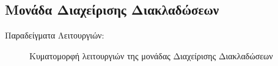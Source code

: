 \documentclass[11pt]{extarticle}
\begin{document}
\subsection{Μονάδα Διαχείρισης Διακλαδώσεων}
Παραδείγματα Λειτουργιών:
\begin{figure}[H]
\centering
\renewcommand{\figurename}{Κυματομορφή} 
\caption[Κυματομορφή - Μονάδα Διαχείρισης Διακλαδώσεων]{Κυματομορφή λειτουργιών της μονάδας Διαχείρισης Διακλαδώσεων}
\end{figure}
\end{document}
